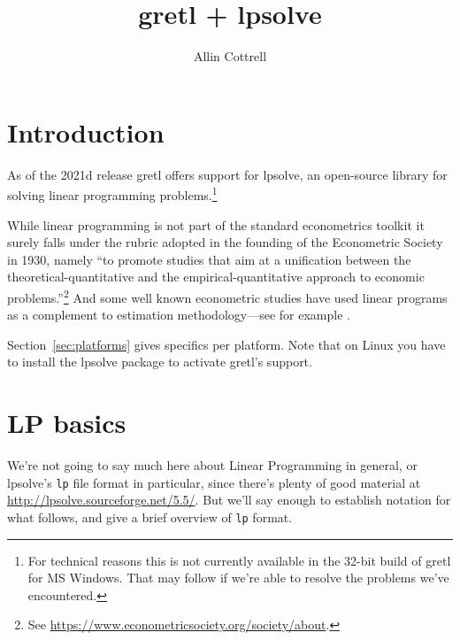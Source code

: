 \documentclass{article}
\begin{document}
\setlength{\parindent}{0pt}
\setlength{\parskip}{1ex}
\setcounter{secnumdepth}{1}

\newenvironment{funcdoc}
{\noindent\hrulefill\\[-10pt]}
{\medskip}

\newcommand{\argname}[1]{\textsl{#1}}

\title{gretl + lpsolve}
\author{Allin Cottrell}
\maketitle

\section{Introduction}
\label{sec:intro}

As of the 2021d release gretl offers support for \textsf{lpsolve}, an
open-source library for solving linear programming
problems.\footnote{For technical reasons this is not currently
  available in the 32-bit build of gretl for MS Windows. That may
  follow if we're able to resolve the problems we've encountered.}

While linear programming is not part of the standard econometrics
toolkit it surely falls under the rubric adopted in the founding of
the Econometric Society in 1930, namely ``to promote studies that aim
at a unification between the theoretical-quantitative and the
empirical-quantitative approach to economic problems.''\footnote{See
  \url{https://www.econometricsociety.org/society/about}.} And
some well known econometric studies have used linear programs as a
complement to estimation methodology---see for example
\cite{ferrier-lovell90}.

Section~\ref{sec:platforms} gives specifics per platform. Note that on
Linux you have to install the \textsf{lpsolve} package to activate
gretl's support.

\section{LP basics}
\label{sec:basics}

We're not going to say much here about Linear Programming in general,
or \textsf{lpsolve}'s \texttt{lp} file format in particular, since
there's plenty of good material at
\url{http://lpsolve.sourceforge.net/5.5/}. But we'll say enough to
establish notation for what follows, and give a brief overview of
\texttt{lp} format.
\end{document}
